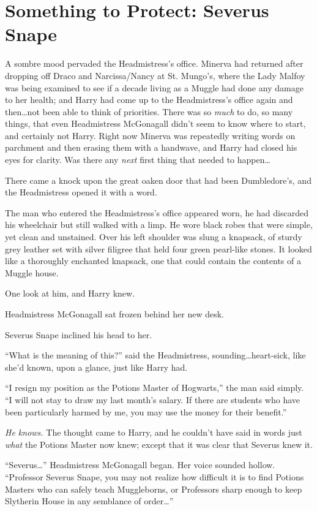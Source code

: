 \chapter{Something to Protect: Severus Snape}

\lettrine{A}{} sombre mood
pervaded the Headmistress’s office. Minerva had returned after dropping off Draco and Narcissa/Nancy at St. Mungo’s, where the Lady Malfoy was being examined to see if a decade living as a Muggle had done any damage to her health; and Harry had come up to the Headmistress’s office again and then…not been able to think of priorities. There was so \emph{much} to do, so many things, that even Headmistress McGonagall didn’t seem to know where to start, and certainly not Harry. Right now Minerva was repeatedly writing words on parchment and then erasing them with a handwave, and Harry had closed his eyes for clarity. Was there any \emph{next} first thing that needed to happen…

There came a knock upon the great oaken door that had been Dumbledore’s, and the Headmistress opened it with a word.

The man who entered the Headmistress’s office appeared worn, he had discarded his wheelchair but still walked with a limp. He wore black robes that were simple, yet clean and unstained. Over his left shoulder was slung a knapsack, of sturdy grey leather set with silver filigree that held four green pearl-like stones. It looked like a thoroughly enchanted knapsack, one that could contain the contents of a Muggle house.

One look at him, and Harry knew.

Headmistress McGonagall sat frozen behind her new desk.

Severus Snape inclined his head to her.

“What is the meaning of this?” said the Headmistress, sounding…heart-sick, like she’d known, upon a glance, just like Harry had.

“I resign my position as the Potions Master of Hogwarts,” the man said simply. “I will not stay to draw my last month’s salary. If there are students who have been particularly harmed by me, you may use the money for their benefit.”

\emph{He knows.} The thought came to Harry, and he couldn’t have said in words just \emph{what} the Potions Master now knew; except that it was clear that Severus knew it.

“Severus…” Headmistress McGonagall began. Her voice sounded hollow. “Professor Severus Snape, you may not realize how difficult it is to find Potions Masters who can safely teach Muggleborns, or Professors sharp enough to keep Slytherin House in any semblance of order…”

